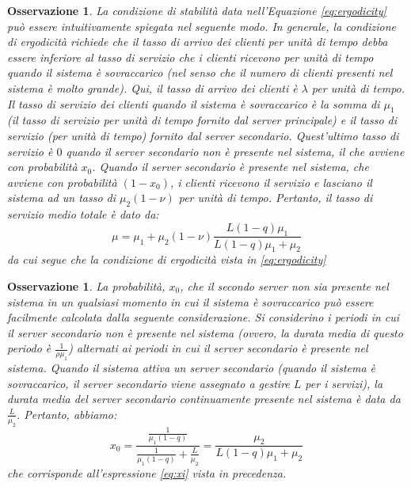 \documentclass[11pt]{article}
\newtheorem{osservazione}[teorema]{Osservazione}
\begin{document}
\begin{osservazione}
    La condizione di stabilità data nell'Equazione \ref{eq:ergodicity} può essere intuitivamente spiegata nel seguente modo. In generale, la condizione di ergodicità richiede che il tasso di arrivo dei clienti per unità di tempo debba essere inferiore al tasso di servizio che i clienti ricevono per unità di tempo quando il sistema è sovraccarico (nel senso che il numero di clienti presenti nel sistema è molto grande). Qui, il tasso di arrivo dei clienti è $\lambda$ per unità di tempo. Il tasso di servizio dei clienti quando il sistema è sovraccarico è la somma di $\mu_1$ (il tasso di servizio per unità di tempo fornito dal server principale) e il tasso di servizio (per unità di tempo) fornito dal server secondario. Quest'ultimo tasso di servizio è $0$ quando il server secondario non è presente nel sistema, il che avviene con probabilità $x_0$. Quando il server secondario è presente nel sistema, che avviene con probabilità $(1 - x_0)$, i clienti ricevono il servizio e lasciano il sistema ad un tasso di $\mu_2 (1 - \nu)$ per unità di tempo. Pertanto, il tasso di servizio medio totale è dato da:
    \begin{equation}
        \mu = \mu_1 + \mu_2(1 - \nu) \frac{L(1-q)\mu_1}{L(1-q)\mu_1 + \mu_2}
    \end{equation}
    da cui segue che la condizione di ergodicità vista in \ref{eq:ergodicity}
\end{osservazione}

\begin{osservazione}
    La probabilità, $x_0$, che il secondo server non sia presente nel sistema in un qualsiasi momento in cui il sistema è sovraccarico può essere facilmente calcolata dalla seguente considerazione. Si considerino i periodi in cui il server secondario non è presente nel sistema (ovvero, la durata media di questo periodo è $\frac{1}{\rho \mu_1}$) alternati ai periodi in cui il server secondario è presente nel sistema. Quando il sistema attiva un server secondario (quando il sistema è sovraccarico, il server secondario viene assegnato a gestire $L$ per i servizi), la durata media del server secondario continuamente presente nel sistema è data da $\frac{L}{\mu_2}$. Pertanto, abbiamo:
    \begin{equation}
        x_0  = \frac{\frac{1}{\mu_1(1-q)}}{\frac{1}{\mu_1(1-q)} + \frac{L}{\mu_2}} = \frac{\mu_2}{L(1-q)\mu_1 + \mu_2}
    \end{equation}
    che corrisponde all'espressione \ref{eq:xi} vista in precedenza.
\end{osservazione}
\end{document}
